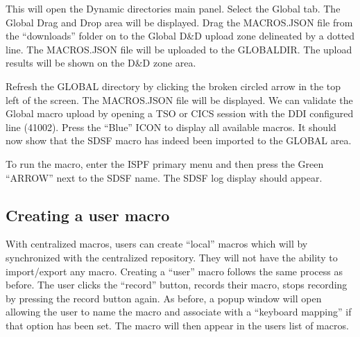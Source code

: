 \documentclass[letterpaper,10pt,english]{sphinxmanual}
\begin{document}
\sphinxAtStartPar
{}

\sphinxAtStartPar
This will open the Dynamic directories main panel. Select the Global tab. The Global Drag and Drop area will be displayed. Drag the MACROS.JSON file from the “downloads” folder on to the Global D\&D upload zone delineated by a dotted line. The MACROS.JSON file will be uploaded to the GLOBAL\sphinxhyphen{}DIR. The upload results will be shown on the D\&D zone area.

\sphinxAtStartPar
{}

\sphinxAtStartPar
{}

\sphinxAtStartPar
Refresh the GLOBAL directory by clicking the broken circled arrow in the top left of the screen. The MACROS.JSON file will be displayed. We can validate the Global macro upload by opening a TSO or CICS session with the DDI configured line (41002). Press the “Blue” ICON to display all available macros. It should now show that the SDSF macro has indeed been imported to the GLOBAL area.

\sphinxAtStartPar
{}

\sphinxAtStartPar
{}

\sphinxAtStartPar
To run the macro, enter the ISPF primary menu and then press the Green “ARROW” next to the SDSF name. The SDSF log display should appear.

\ignorespaces 

\subsection{Creating a user macro}
\label{\detokenize{Customization:creating-a-user-macro}}\label{\detokenize{Customization:index-88}}
\sphinxAtStartPar
With centralized macros, users can create “local” macros which will by synchronized with the centralized repository. They will not have the ability to import/export any macro.
Creating a “user” macro follows the same process as before. The user clicks the “record” button, records their macro, stops recording by pressing the record button again. As before, a popup window will open allowing the user to name the macro and associate with a “keyboard mapping” if that option has been set. The macro will then appear in the users list of macros.
\end{document}
